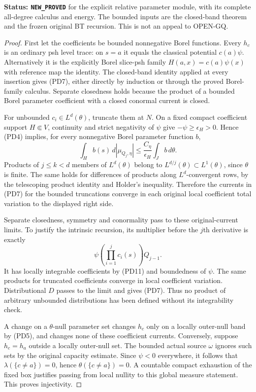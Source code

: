 \documentclass[11pt,a4paper]{article}
\numberwithin{equation}{section}
\theoremstyle{definition}
\theoremstyle{remark}
\begin{document}
\noindent\textbf{Status: \texttt{NEW\_PROVED}} for the
explicit relative parameter module, with its complete
all-degree calculus and energy. The bounded inputs are
the closed-band theorem and the frozen original BT
recursion. This is not an appeal to OPEN-GQ.

\begin{proof}
First let the coefficients be bounded nonnegative Borel
functions. Every $h_c$ is an ordinary psh level trace:
on $s=a$ it equals the classical potential $c(a)\psi$.
Alternatively it is the explicitly Borel slice-psh family
$H(a,x)=c(a)\psi(x)$ with reference map the identity.
The closed-band identity applied at every insertion gives
(PD7), either directly by induction or through the proved
Borel-family calculus. Separate closedness holds because
the product of a bounded Borel parameter coefficient with
a closed conormal current is closed.

For unbounded $c_i\in L^d(\theta)$, truncate them at $N$.
On a fixed compact coefficient support $H\Subset V$,
continuity and strict negativity of $\psi$ give
$-\psi\geq\epsilon_H>0$. Hence (PD4) implies, for every
nonnegative Borel parameter function $b$,
\[
 \int_H b(s)\,d|\mu_{Q_j,\eta}|
       \leq \frac{C_\eta}{\epsilon_H}\int_J b\,d\theta.
 \tag{PD11}
\]
Products of $j\leq k<d$ members of $L^d(\theta)$ belong
to $L^{d/j}(\theta)\subset L^1(\theta)$, since $\theta$
is finite. The same holds for differences of products
along $L^d$-convergent rows, by the telescoping product
identity and Holder's inequality. Therefore the currents
in (PD7) for the bounded truncations converge in each
original local coefficient total variation to the
displayed right side.

Separate closedness, symmetry and conormality pass to
these original-current limits. To justify the intrinsic
recursion, its multiplier before the $j$th derivative
is exactly
\[
             \psi\left(\prod_{i=1}^j c_i(s)\right)Q_{j-1}.
\]
It has locally integrable coefficients by (PD11) and
boundedness of $\psi$. The same products for truncated
coefficients converge in local coefficient variation.
Distributional $D$ passes to the limit and gives (PD7).
Thus no product of arbitrary unbounded distributions has
been defined without its integrability check.

A change on a $\theta$-null parameter set changes $h_c$
only on a locally outer-null band by (PD5), and changes
none of these coefficient currents. Conversely, suppose
$h_c=h_a$ outside a locally outer-null set. The bounded
actual source $\omega$ ignores such sets by the original
capacity estimate. Since $\psi<0$ everywhere, it follows
that $\lambda(\{c\ne a\})=0$, hence
$\theta(\{c\ne a\})=0$. A countable compact exhaustion
of the fixed box justifies passing from local nullity
to this global measure statement. This proves injectivity.


\end{proof}
\end{document}
